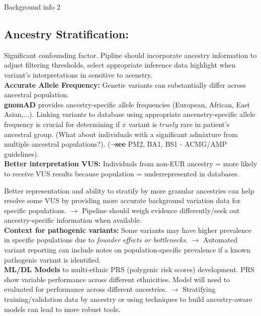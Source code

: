\documentclass[twocolumn]{article}
\begin{document}
\begin{literaturepaper}{Background info 2}
\label{background-info-4}
\small
\subsection*{Ancestry Stratification:} Significant confounding factor. 
Pipline should incorporate ancestry information to adjust filtering thresholds, select appropriate inference data highlight when variant's interpretations in sensitive to acenstry. \\

\textbf{Accurate Allele Frequency:} Genetic variants can substantially differ across ancestral population.\\

\textbf{gnomAD} provides ancestry-specific allele frequencies (European, African, East Asian,...). Linking variants to database using appropriate ancenstry-specific allele frequency is crucial for determining if $x$ variant is $truely$ rare in patient's ancestral group.  (What about individuals with a significant admixture from multiple ancestral populations?). (\textbf{$\neg$see} PM2, BA1, BS1 - ACMG/AMP guidelines).\\

\textbf{Better interpretation VUS:} Individuals from non-EUR ancestry = more likely to receive VUS results because population = underrepresented in databases. 

Better representation and ability to stratify by more granular ancestries can help resolve some VUS by providing more accurate background variation data for specific populations.  $\rightarrow$ Pipeline should weigh evidence differently/seek out ancestry-specific information when available.\\

\textbf{Context for pathogenic variants:} Some variants may have higher prevalence in specific populations due to \textit{founder effects or bottlenecks}. $\rightarrow$ Automated variant reporting can include notes on population-specific prevalence if a known pathogenic variant is identified. \\

\textbf{ML/DL Models} to multi-ethnic PRS (polygenic risk scores) development. PRS show variable performance across different ethnicities. Model will need to evaluated for performance across different ancestries. $\rightarrow$ Stratifying training/validation data by ancestry or using techniques to build ancestry-aware models can lead to more robust tools.  


\end{literaturepaper}
\end{document}
